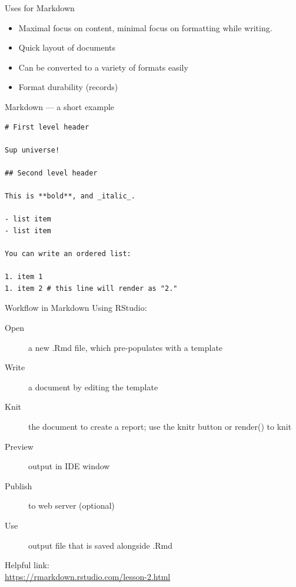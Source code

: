\documentclass{beamer}
\begin{document}
\begin{frame}{Uses for Markdown}
\begin{itemize}
  \item Maximal focus on content, minimal focus on formatting while writing.
  \item Quick layout of documents
  \item Can be converted to a variety of formats easily
  \item Format durability (records)
\end{itemize}
\end{frame}

\begin{frame}[fragile]{Markdown --- a short example}
\begin{exampleblock}{}
\begin{lstlisting}
# First level header

Sup universe!

## Second level header

This is **bold**, and _italic_.

- list item
- list item

You can write an ordered list:

1. item 1
1. item 2 # this line will render as "2."
\end{lstlisting}
\end{exampleblock}
\end{frame}

\begin{frame}{Workflow in Markdown}
Using RStudio:
\begin{description}
\item[Open] a new .Rmd file, which pre-populates with a template
\item[Write] a document by editing the template
\item[Knit] the document to create a report; use the knitr button or render() to knit
\item[Preview] output in IDE window
\item[Publish] to web server (optional)
\item[Use] output file that is saved alongside .Rmd
\end{description}
\vfill
Helpful link: \\ \url{https://rmarkdown.rstudio.com/lesson-2.html}
\end{frame}
\end{document}
